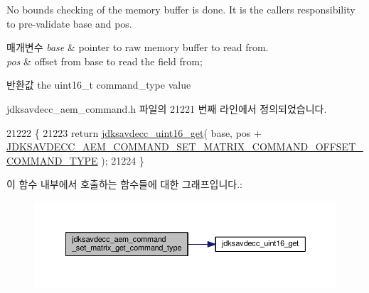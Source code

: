 No bounds checking of the memory buffer is done. It is the caller\textquotesingle{}s responsibility to pre-\/validate base and pos.


\begin{DoxyParams}{매개변수}
{\em base} & pointer to raw memory buffer to read from. \\
\hline
{\em pos} & offset from base to read the field from; \\
\hline
\end{DoxyParams}
\begin{DoxyReturn}{반환값}
the uint16\+\_\+t command\+\_\+type value 
\end{DoxyReturn}


jdksavdecc\+\_\+aem\+\_\+command.\+h 파일의 21221 번째 라인에서 정의되었습니다.


\begin{DoxyCode}
21222 \{
21223     \textcolor{keywordflow}{return} \hyperlink{group__endian_ga3fbbbc20be954aa61e039872965b0dc9}{jdksavdecc\_uint16\_get}( base, pos + 
      \hyperlink{group__command__set__matrix_gabf16037284ffb81f28b8cc61b0debfb7}{JDKSAVDECC\_AEM\_COMMAND\_SET\_MATRIX\_COMMAND\_OFFSET\_COMMAND\_TYPE}
       );
21224 \}
\end{DoxyCode}


이 함수 내부에서 호출하는 함수들에 대한 그래프입니다.\+:
\nopagebreak
\begin{figure}[H]
\begin{center}
\leavevmode
\includegraphics[width=350pt]{group__command__set__matrix_gae7e2dc9920074b51147a24e2ef71143a_cgraph}
\end{center}
\end{figure}


